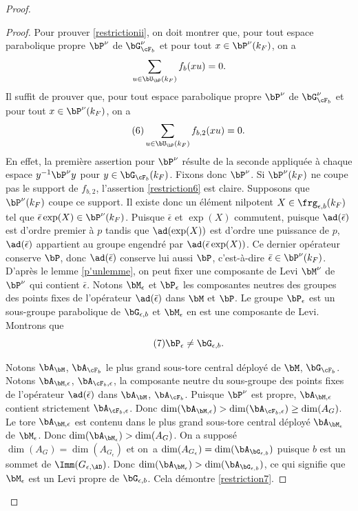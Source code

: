 \begin{proof}
\begin{proof}
Pour prouver \eqref{restrictionii}, on doit montrer que, pour tout espace parabolique propre $\bP^{\nu}$ de $\bG_{\cF_{b}}^{\nu}$ et pour tout $x\in \bP^{\nu}(k_{F})$, on a
\[
\sum_{u\in \bU_{\bP}(k_{F})}f_{b}(xu)=0.
\]
Il suffit de prouver que, pour tout espace parabolique propre $\bP^{\nu}$ de $\bG_{\cF_{b}}^{\nu}$ et pour tout $x\in \bP^{\nu}(k_{F})$, on a
\begin{equation}\tag{6}\label{restriction6}
\sum_{u\in \bU_{\bP}(k_{F})}f_{b,2}(xu)=0.
\end{equation}
En effet, la première assertion pour $\bP^{\nu}$ résulte de la seconde appliquée à chaque espace $y^{-1}\bP^{\nu}y$ pour $y\in \bG_{\cF_{b}}(k_{F})$. Fixons donc $\bP^{\nu}$. Si $\bP^{\nu}(k_{F})$ ne coupe pas le support de $f_{b,2}$, l'assertion \eqref{restriction6} est claire. Supposons que $\bP^{\nu}(k_{F})$ coupe ce support. Il existe donc un élément nilpotent $X\in \boldsymbol{\frg}_{\epsilon,b}(k_{F})$ tel que $\bar{\epsilon}\exp(X)\in \bP^{\nu}(k_{F})$. Puisque $\bar{\epsilon}$ et $\exp(X)$ commutent, puisque $\ad(\bar{\epsilon})$ est d'ordre premier à $p$ tandis que $\ad(\exp(X))$ est d'ordre une puissance de $p$, $\ad(\bar{\epsilon})$ appartient au groupe engendré par $\ad(\bar{\epsilon}\exp(X))$. Ce dernier opérateur conserve $\bP$, donc $\ad(\bar{\epsilon})$ conserve lui aussi $\bP$, c'est-à-dire $\bar{\epsilon}\in\nobreak \bP^{\nu}(k_{F})$. D'après le lemme \ref{p'unlemme}, on peut fixer une composante de Levi $\bM^{\nu}$ de $\bP^{\nu}$ qui contient $\bar{\epsilon}$. Notons $\bM_{\epsilon}$ et $\bP_{\epsilon}$ les composantes neutres des groupes des points fixes de l'opérateur $\ad(\bar{\epsilon})$ dans $\bM$ et $\bP$. Le groupe $\bP_{\epsilon}$ est un sous-groupe parabolique de $\bG_{\epsilon,b}$ et $\bM_{\epsilon}$ en est une composante de Levi. Montrons que
\begin{equation}\tag{7}\label{restriction7}
\bP_{\epsilon}\neq\bG_{\epsilon,b}.
\end{equation}

Notons $\bA_{\bM}$, \resp $\bA_{\cF_{b}}$ le plus grand sous-tore central déployé de $\bM$, \resp $\bG_{\cF_{b}}$. Notons $\bA_{\bM,\epsilon}$, \resp $\bA_{\cF_{b},\epsilon}$, la composante neutre du sous-groupe des points fixes de l'opérateur $\ad(\bar{\epsilon})$ dans $\bA_{\bM}$, \resp $\bA_{\cF_{b}}$. Puisque $\bP^{\nu}$ est propre, $\bA_{\bM,\epsilon}$ contient strictement $\bA_{\cF_{b},\epsilon}$. Donc $\dim(\bA_{\bM,\epsilon})>\dim(\bA_{\cF_{b},\epsilon})\geq \dim(A_{G})$. Le tore $\bA_{\bM,\epsilon}$ est contenu dans le plus grand sous-tore central déployé $\bA_{\bM_{\epsilon}}$ de $\bM_{\epsilon}$. Donc $\dim(\bA_{\bM_{\epsilon}})> \dim(A_{G})$. On a supposé $\dim(A_{G})=\dim(A_{G_{\epsilon}})$ et on~a $\dim(A_{G_{\epsilon}})=\dim(\bA_{\bG_{\epsilon,b}})$ puisque $b$ est un sommet de $\Imm(G_{\epsilon,\AD})$. Donc $\dim(\bA_{\bM_{\epsilon}})> \dim(\bA_{\bG_{\epsilon,b}})$, ce qui signifie que $\bM_{\epsilon}$ est un Levi propre de $\bG_{\epsilon,b}$. Cela démontre \eqref{restriction7}.


\end{proof}
\end{proof}

